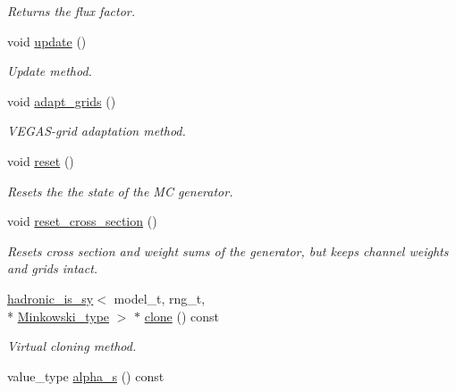 \begin{DoxyCompactItemize}
\begin{DoxyCompactList}\small\item\em Returns the flux factor. \end{DoxyCompactList}\item 
void \hyperlink{a00255_a6436d3581b268b19b9c4ae576fb2b8f6}{update} ()
\begin{DoxyCompactList}\small\item\em Update method. \end{DoxyCompactList}\item 
\hypertarget{a00255_a758d1e8e7b40f03cc075521722616539}{void \hyperlink{a00255_a758d1e8e7b40f03cc075521722616539}{adapt\-\_\-grids} ()}\label{a00255_a758d1e8e7b40f03cc075521722616539}

\begin{DoxyCompactList}\small\item\em V\-E\-G\-A\-S-\/grid adaptation method. \end{DoxyCompactList}\item 
void \hyperlink{a00255_a413a2200c7a02cdf6468b705b624a2e1}{reset} ()
\begin{DoxyCompactList}\small\item\em Resets the the state of the M\-C generator. \end{DoxyCompactList}\item 
void \hyperlink{a00255_ad6b7a3a115e2b7af31b1bcc98577dfff}{reset\-\_\-cross\-\_\-section} ()
\begin{DoxyCompactList}\small\item\em Resets cross section and weight sums of the generator, but keeps channel weights and grids intact. \end{DoxyCompactList}\item 
\hypertarget{a00255_a8dcae9b69d0c265f56914cd59f18c63e}{\hyperlink{a00254}{hadronic\-\_\-is\-\_\-sy}$<$ model\-\_\-t, rng\-\_\-t, \\*
\hyperlink{a00369}{Minkowski\-\_\-type} $>$ $\ast$ \hyperlink{a00255_a8dcae9b69d0c265f56914cd59f18c63e}{clone} () const }\label{a00255_a8dcae9b69d0c265f56914cd59f18c63e}

\begin{DoxyCompactList}\small\item\em Virtual cloning method. \end{DoxyCompactList}\item 
\hypertarget{a00255_aa3b7deda67549e6eb64d6a975a57247e}{value\-\_\-type \hyperlink{a00255_aa3b7deda67549e6eb64d6a975a57247e}{alpha\-\_\-s} () const }\label{a00255_aa3b7deda67549e6eb64d6a975a57247e}


\end{DoxyCompactItemize}
